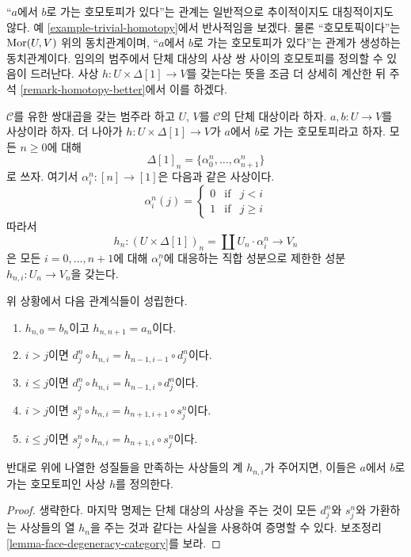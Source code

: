\noindent
``$a$에서 $b$로 가는 호모토피가 있다''는 관계는 일반적으로 추이적이지도
대칭적이지도 않다. 예 \ref{example-trivial-homotopy}에서 반사적임을
보겠다. 물론 ``호모토픽이다''는 $\mathop{\mathrm{Mor}}\nolimits(U, V)$ 위의 동치관계이며,
``$a$에서 $b$로 가는 호모토피가 있다''는 관계가 생성하는 동치관계이다.
임의의 범주에서 단체 대상의 사상 쌍 사이의 호모토피를 정의할 수 있음이
드러난다. 사상 $h : U \times \Delta[1] \to V$를 갖는다는 뜻을 조금 더
상세히 계산한 뒤 주석 \ref{remark-homotopy-better}에서 이를 하겠다.

\medskip\noindent
$\mathcal{C}$를 유한 쌍대곱을 갖는 범주라 하고 $U$, $V$를
$\mathcal{C}$의 단체 대상이라 하자. $a, b : U \to V$를 사상이라 하자.
더 나아가 $h : U \times \Delta[1] \to V$가 $a$에서 $b$로 가는
호모토피라고 하자. 모든 $n \geq 0$에 대해
$$
\Delta[1]_n = \{\alpha^n_0, \ldots, \alpha^n_{n + 1}\}
$$
로 쓰자. 여기서 $\alpha^n_i : [n] \to [1]$은 다음과 같은 사상이다.
$$
\alpha^n_i(j)
=
\left\{
\begin{matrix}
0 & \text{if} & j < i\\
1 & \text{if} & j \geq i
\end{matrix}
\right.
$$
따라서
$$
h_n : (U \times \Delta[1])_n = \coprod U_n \cdot \alpha^n_i
\longrightarrow
V_n
$$
은 모든 $i = 0, \ldots, n + 1$에 대해 $\alpha^n_i$에 대응하는 직합
성분으로 제한한 성분 $h_{n, i} : U_n \to V_n$을 갖는다.

\begin{lemma}
\label{lemma-relations-homotopy}
위 상황에서 다음 관계식들이 성립한다.
\begin{enumerate}
\item $h_{n, 0} = b_n$이고 $h_{n, n + 1} = a_n$이다.
\item $i > j$이면
$d^n_j \circ h_{n, i} = h_{n - 1, i - 1} \circ d^n_j$이다.
\item $i \leq j$이면
$d^n_j \circ h_{n, i} = h_{n - 1, i} \circ d^n_j$이다.
\item $i > j$이면
$s^n_j \circ h_{n, i} = h_{n + 1, i + 1} \circ s^n_j$이다.
\item $i \leq j$이면
$s^n_j \circ h_{n, i} = h_{n + 1, i} \circ s^n_j$이다.
\end{enumerate}
반대로 위에 나열한 성질들을 만족하는 사상들의 계 $h_{n, i}$가 주어지면,
이들은 $a$에서 $b$로 가는 호모토피인 사상 $h$를 정의한다.
\end{lemma}

\begin{proof}
생략한다. 마지막 명제는 단체 대상의 사상을 주는 것이 모든 $d^n_j$와
$s^n_j$와 가환하는 사상들의 열 $h_n$을 주는 것과 같다는 사실을 사용하여
증명할 수 있다. 보조정리 \ref{lemma-face-degeneracy-category}를 보라.
\end{proof}

